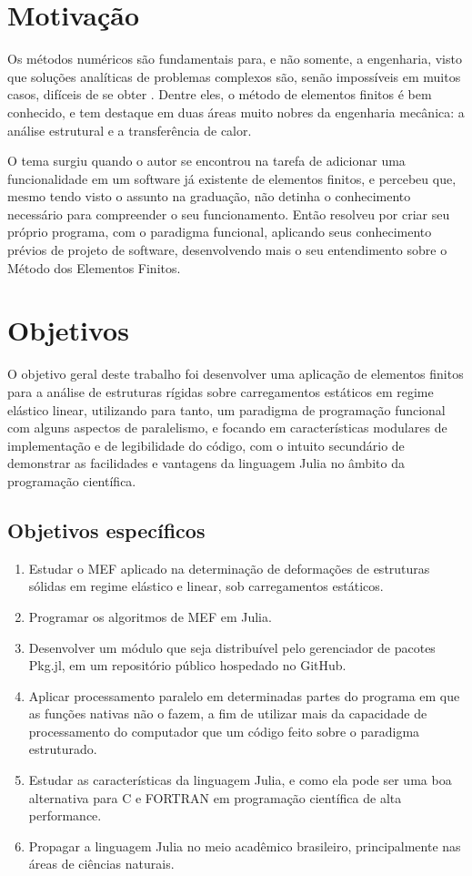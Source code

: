 \section{Motivação}

Os métodos numéricos são fundamentais para, e não somente, a engenharia, visto que soluções analíticas de problemas complexos são, senão impossíveis em muitos casos, difíceis de se obter \cite{Onate}. Dentre eles, o método de elementos finitos é bem conhecido, e tem destaque em duas áreas muito nobres da engenharia mecânica: a análise estrutural e a transferência de calor.

O tema surgiu quando o autor se encontrou na tarefa de adicionar uma funcionalidade em um software já existente de elementos finitos, e percebeu que, mesmo tendo visto o assunto na graduação, não detinha o conhecimento necessário para compreender o seu funcionamento. Então resolveu por criar seu próprio programa, com o paradigma funcional, aplicando seus conhecimento prévios de projeto de software, desenvolvendo mais o seu entendimento sobre o Método dos Elementos Finitos.


\section{Objetivos}

O objetivo geral deste trabalho foi desenvolver uma aplicação de elementos finitos para a análise de estruturas rígidas sobre carregamentos estáticos em regime elástico linear, utilizando para tanto, um paradigma de programação funcional com alguns aspectos de paralelismo, e focando em características modulares de implementação e de legibilidade do código, com o intuito secundário de demonstrar as facilidades e vantagens da linguagem Julia no âmbito da programação científica.

\subsection{Objetivos específicos}

\begin{enumerate}
    \item Estudar o MEF aplicado na determinação de deformações de estruturas sólidas em regime elástico e linear, sob carregamentos estáticos.
    \item Programar os algoritmos de MEF em Julia.
    \item Desenvolver um módulo que seja distribuível pelo gerenciador de pacotes Pkg.jl, em um repositório público hospedado no GitHub.
    \item Aplicar processamento paralelo em determinadas partes do programa em que as funções nativas não o fazem, a fim de utilizar mais da capacidade de processamento do computador que um código feito sobre o paradigma estruturado.
    \item Estudar as características da linguagem Julia, e como ela pode ser uma boa alternativa para C e FORTRAN em programação científica de alta performance.
    \item Propagar a linguagem Julia no meio acadêmico brasileiro, principalmente nas áreas de ciências naturais.
\end{enumerate}

